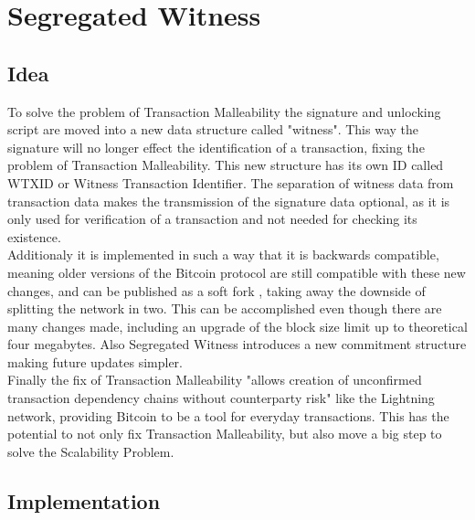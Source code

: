 \section{Segregated Witness}
\label{ch:SegWit}


\subsection{Idea}
\label{sec:SegWit:Idea}
To solve the problem of Transaction Malleability the signature and unlocking script are moved into a new data structure called "witness". This way the signature will no longer effect the identification of a transaction, fixing the problem of Transaction Malleability. This new structure has its own ID called WTXID or Witness Transaction Identifier. The separation of witness data from transaction data makes the transmission of the signature data optional, as it is only used for verification of a transaction and not needed for checking its existence. \\
Additionaly it is implemented in such a way that it is backwards compatible, meaning older versions of the Bitcoin protocol are still compatible with these new changes, and can be published as a soft fork , taking away the downside of splitting the network in two. This can be accomplished even though there are many changes made, including an upgrade of the block size limit up to theoretical four megabytes. Also Segregated Witness introduces a new commitment structure making future updates simpler. \\
Finally the fix of Transaction Malleability "allows creation of unconfirmed transaction dependency chains without counterparty risk"\cite{bip-141} like the Lightning network, providing Bitcoin to be a tool for everyday transactions. This has the potential to not only fix Transaction Malleability, but also move a big step to solve the Scalability Problem.


\subsection{Implementation}
\label{sec:SegWit:Implementation}




